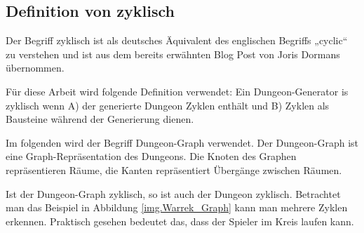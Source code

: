 






\subsection{Definition von zyklisch}\label{c.weitereskapitel}

Der Begriff zyklisch ist als deutsches Äquivalent des englischen Begriffs „cyclic“ zu verstehen und ist aus dem bereits erwähnten Blog Post von Joris Dormans \cite{blogCyclic} übernommen. 

Für diese Arbeit wird folgende Definition verwendet: Ein Dungeon-Generator is zyklisch wenn A) der generierte Dungeon Zyklen enthält und B) Zyklen als Bausteine während der Generierung dienen.

Im folgenden wird der Begriff Dungeon-Graph verwendet. Der Dungeon-Graph ist eine Graph-Repräsentation des Dungeons. Die Knoten des Graphen repräsentieren Räume, die Kanten repräsentiert Übergänge zwischen Räumen. 


Ist der Dungeon-Graph zyklisch, so ist auch der Dungeon zyklisch. Betrachtet man das Beispiel in Abbildung \ref{img.Warrek_Graph} kann man mehrere Zyklen erkennen. Praktisch gesehen bedeutet das, dass der Spieler im Kreis laufen kann. 

